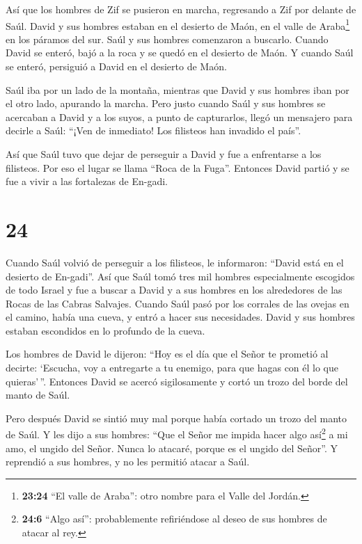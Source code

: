  Así que los hombres de Zif se pusieron en marcha,
regresando a Zif por delante de Saúl. David y sus hombres estaban en el
desierto de Maón, en el valle de Araba\footnote{\textbf{23:24} ``El
  valle de Araba'': otro nombre para el Valle del Jordán.} en los
páramos del sur.  Saúl y sus hombres comenzaron a buscarlo.
Cuando David se enteró, bajó a la roca y se quedó en el desierto de
Maón. Y cuando Saúl se enteró, persiguió a David en el desierto de Maón.

 Saúl iba por un lado de la montaña, mientras que David y
sus hombres iban por el otro lado, apurando la marcha. Pero justo cuando
Saúl y sus hombres se acercaban a David y a los suyos, a punto de
capturarlos,  llegó un mensajero para decirle a Saúl:
``¡Ven de inmediato! Los filisteos han invadido el país''.

 Así que Saúl tuvo que dejar de perseguir a David y fue a
enfrentarse a los filisteos. Por eso el lugar se llama ``Roca de la
Fuga''.  Entonces David partió y se fue a vivir a las
fortalezas de En-gadi.

\hypertarget{section-23}{%
\section{24}\label{section-23}}

 Cuando Saúl volvió de perseguir a los filisteos, le
informaron: ``David está en el desierto de En-gadi''.  Así
que Saúl tomó tres mil hombres especialmente escogidos de todo Israel y
fue a buscar a David y a sus hombres en los alrededores de las Rocas de
las Cabras Salvajes.  Cuando Saúl pasó por los corrales de
las ovejas en el camino, había una cueva, y entró a hacer sus
necesidades. David y sus hombres estaban escondidos en lo profundo de la
cueva.

 Los hombres de David le dijeron: ``Hoy es el día que el
Señor te prometió al decirte: `Escucha, voy a entregarte a tu enemigo,
para que hagas con él lo que quieras'\,''. Entonces David se acercó
sigilosamente y cortó un trozo del borde del manto de Saúl.

 Pero después David se sintió muy mal porque había cortado
un trozo del manto de Saúl.  Y les dijo a sus hombres: ``Que
el Señor me impida hacer algo así\footnote{\textbf{24:6} ``Algo así'':
  probablemente refiriéndose al deseo de sus hombres de atacar al rey.}
a mi amo, el ungido del Señor. Nunca lo atacaré, porque es el ungido del
Señor''.  Y reprendió a sus hombres, y no les permitió
atacar a Saúl.

